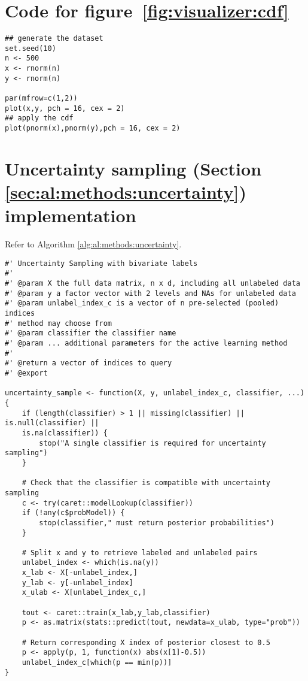 \section{Code for figure~\ref{fig:visualizer:cdf}}
\label{sec:appendicies:cdf}
{
\begin{lstlisting}
## generate the dataset
set.seed(10)
n <- 500
x <- rnorm(n)
y <- rnorm(n)

par(mfrow=c(1,2))
plot(x,y, pch = 16, cex = 2)
## apply the cdf
plot(pnorm(x),pnorm(y),pch = 16, cex = 2)
\end{lstlisting}
}

\section{Uncertainty sampling (Section \ref{sec:al:methods:uncertainty}) 
implementation}
\label{sec:appendicies:al:uncertainty}

Refer to Algorithm \ref{alg:al:methods:uncertainty}. 
{
\begin{lstlisting}
#' Uncertainty Sampling with bivariate labels
#'
#' @param X the full data matrix, n x d, including all unlabeled data
#' @param y a factor vector with 2 levels and NAs for unlabeled data
#' @param unlabel_index_c is a vector of n pre-selected (pooled) indices
#' method may choose from 
#' @param classifier the classifier name
#' @param ... additional parameters for the active learning method
#'
#' @return a vector of indices to query
#' @export

uncertainty_sample <- function(X, y, unlabel_index_c, classifier, ...){
	if (length(classifier) > 1 || missing(classifier) || is.null(classifier) || 
	is.na(classifier)) {
		stop("A single classifier is required for uncertainty sampling")
	}
	
	# Check that the classifier is compatible with uncertainty sampling
	c <- try(caret::modelLookup(classifier))
	if (!any(c$probModel)) {
		stop(classifier," must return posterior probabilities")
	}
	
	# Split x and y to retrieve labeled and unlabeled pairs
	unlabel_index <- which(is.na(y))
	x_lab <- X[-unlabel_index,]
	y_lab <- y[-unlabel_index]
	x_ulab <- X[unlabel_index_c,]
	
	tout <- caret::train(x_lab,y_lab,classifier)
	p <- as.matrix(stats::predict(tout, newdata=x_ulab, type="prob"))
	
	# Return corresponding X index of posterior closest to 0.5
	p <- apply(p, 1, function(x) abs(x[1]-0.5))
	unlabel_index_c[which(p == min(p))]
}
\end{lstlisting}
}

